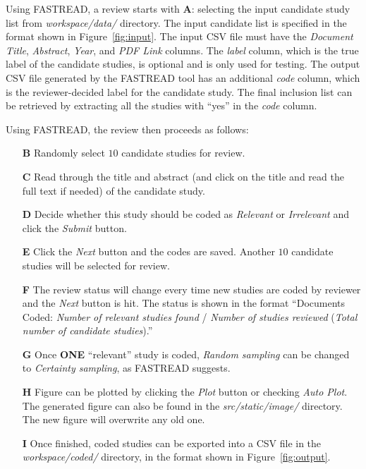 \documentclass[final,twocolumn,5p]{elsarticle}
\theoremstyle{break}
\begin{document}
Using FASTREAD, a review starts with \textbf{A}: selecting the input candidate study list from \textit{workspace/data/} directory. The input candidate list is specified in the format shown in Figure~\ref{fig:input}. The input CSV file must have the \textit{Document Title}, \textit{Abstract}, \textit{Year}, and \textit{PDF Link} columns. The \textit{label} column, which is the true label of the candidate studies, is optional and is only used for testing. The output CSV file generated by the FASTREAD tool has an additional \textit{code} column, which is the reviewer-decided label for the candidate study. The final inclusion list can be retrieved by extracting all the studies with ``yes'' in the \textit{code} column.

Using FASTREAD, the review then proceeds as follows:
\begin{enumerate}
\item[\textbf{B}] Randomly select $10$ candidate studies for review.
\item[\textbf{C}] Read through the title and abstract (and click on the title and read the full text if needed) of the candidate study.
\item[\textbf{D}] Decide whether this study should be coded as \textit{Relevant} or \textit{Irrelevant} and click the \textit{Submit} button.
\item[\textbf{E}] Click the \textit{Next} button and the codes are saved. Another $10$ candidate studies will be selected for review.
\item[\textbf{F}] The review status will change every time new studies are coded by reviewer and the \textit{Next} button is hit. The status is shown in the format ``Documents Coded: \textit{Number of relevant studies found} / \textit{Number of studies reviewed} (\textit{Total number of candidate studies}).''
\item[\textbf{G}] Once \textbf{ONE} ``relevant'' study is coded, \textit{Random sampling} can be changed to \textit{Certainty sampling}, as FASTREAD suggests.
\item[\textbf{H}] Figure can be plotted by clicking the \textit{Plot} button or checking \textit{Auto Plot}. The generated figure can also be found in the \textit{src/static/image/} directory. The new figure will overwrite any old one.
\item[\textbf{I}] Once finished, coded studies can be exported into a CSV file in the \textit{workspace/coded/} directory, in the format shown in Figure~\ref{fig:output}.
\end{enumerate}
\end{document}

